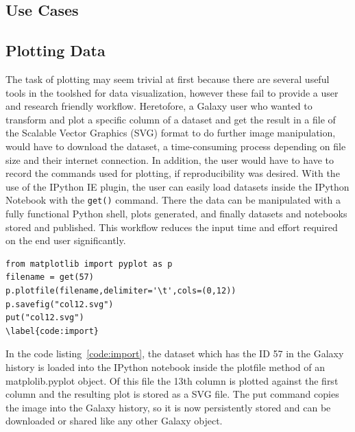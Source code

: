 \documentclass{bioinfo}
\begin{document}
\begin{methods}
\section{Use Cases}
\subsection{Plotting Data}
The task of plotting may seem trivial at first because there are several useful tools in the toolshed for data visualization,
however these fail to provide a user and research friendly workflow.
Heretofore, a Galaxy user who wanted to transform and plot a specific column of a dataset and
get the result in a file of the Scalable Vector Graphics (SVG) format to do further image manipulation,
would have to download the dataset, a time-consuming process depending on file size and their internet
connection. In addition, the user would have to have to record the commands used for plotting, if reproducibility was desired.
With the use of the IPython IE plugin, the user can easily load datasets inside the IPython Notebook with the \texttt{get()} command. There the data can be manipulated 
with a fully functional Python shell, plots generated, and finally datasets and notebooks stored and published.
This workflow reduces the input time and effort required on the end user significantly.

\begin{lstlisting}[frame=single]
from matplotlib import pyplot as p
filename = get(57)
p.plotfile(filename,delimiter='\t',cols=(0,12))
p.savefig("col12.svg")
put("col12.svg")
\label{code:import}
\end{lstlisting}
In the code listing~\ref{code:import}, the dataset which has the ID 57 in the Galaxy history is loaded into the IPython notebook inside the
plotfile method of an matplolib.pyplot object. Of this file the 13th column is plotted against the first column and the
resulting plot is stored as a SVG file. The put command copies the image into the Galaxy history, so it is now persistently
stored and can be downloaded or shared like any other Galaxy object.


\end{methods}
\end{document}
